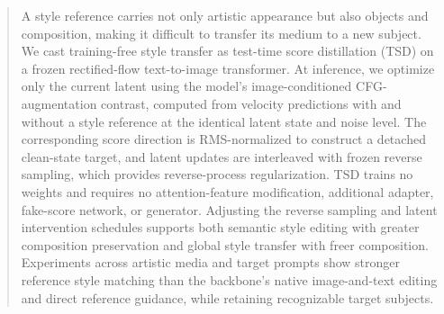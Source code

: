 \begin{abstract}
A style reference carries not only artistic appearance but also objects and
composition, making it difficult to transfer its medium to a new subject.
We cast training-free style transfer as test-time score distillation (TSD)
on a frozen rectified-flow text-to-image transformer. At inference, we
optimize only the current latent using the model's image-conditioned
CFG-augmentation contrast, computed from velocity predictions with and
without a style reference at the identical latent state and noise level.
The corresponding score direction is RMS-normalized to construct a
detached clean-state target, and latent updates are interleaved with
frozen reverse sampling, which provides reverse-process regularization. TSD trains no weights and
requires no attention-feature modification, additional adapter, fake-score
network, or generator. Adjusting the reverse sampling and latent
intervention schedules supports both semantic style editing with greater
composition preservation and global style transfer with freer composition.
Experiments across artistic media and target prompts show stronger
reference style matching than the backbone's native image-and-text editing
and direct reference guidance, while retaining recognizable target subjects.
\end{abstract}
